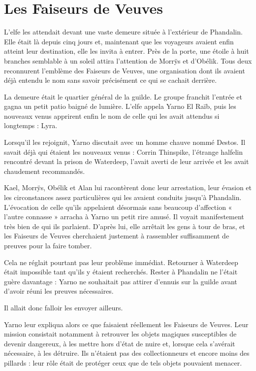 \chapter{Les Faiseurs de Veuves}

L'elfe les attendait devant une vaste demeure située à l'extérieur de Phandalin. Elle était là depuis cinq jours et, maintenant que les voyageurs avaient enfin atteint leur destination, elle les invita à entrer. Près de la porte, une étoile à huit branches semblable à un soleil attira l'attention de Morrÿs et d'Obélik. Tous deux reconnurent l'emblème des Faiseurs de Veuves, une organisation dont ils avaient déjà entendu le nom sans savoir précisément ce qui se cachait derrière.

La demeure était le quartier général de la guilde. Le groupe franchit l'entrée et gagna un petit patio baigné de lumière. L'elfe appela Yarno El Raïb, puis les nouveaux venus apprirent enfin le nom de celle qui les avait attendus si longtemps : Lyra.

Lorsqu'il les rejoignit, Yarno discutait avec un homme chauve nommé Destos. Il savait déjà qui étaient les nouveaux venus : Corrin Thinspike, l'étrange halfelin rencontré devant la prison de Waterdeep, l'avait averti de leur arrivée et les avait chaudement recommandés.

Kael, Morrÿs, Obélik et Alan lui racontèrent donc leur arrestation, leur évasion et les circonstances assez particulières qui les avaient conduits jusqu'à Phandalin. L'évocation de celle qu'ils appelaient désormais sans beaucoup d'affection « l'autre connasse » arracha à Yarno un petit rire amusé. Il voyait manifestement très bien de qui ils parlaient. D'après lui, elle arrêtait les gens à tour de bras, et les Faiseurs de Veuves cherchaient justement à rassembler suffisamment de preuves pour la faire tomber.

Cela ne réglait pourtant pas leur problème immédiat. Retourner à Waterdeep était impossible tant qu'ils y étaient recherchés. Rester à Phandalin ne l'était guère davantage : Yarno ne souhaitait pas attirer d'ennuis sur la guilde avant d'avoir réuni les preuves nécessaires.

Il allait donc falloir les envoyer ailleurs.

Yarno leur expliqua alors ce que faisaient réellement les Faiseurs de Veuves. Leur mission consistait notamment à retrouver les objets magiques susceptibles de devenir dangereux, à les mettre hors d'état de nuire et, lorsque cela s'avérait nécessaire, à les détruire. Ils n'étaient pas des collectionneurs et encore moins des pillards : leur rôle était de protéger ceux que de tels objets pouvaient menacer.

